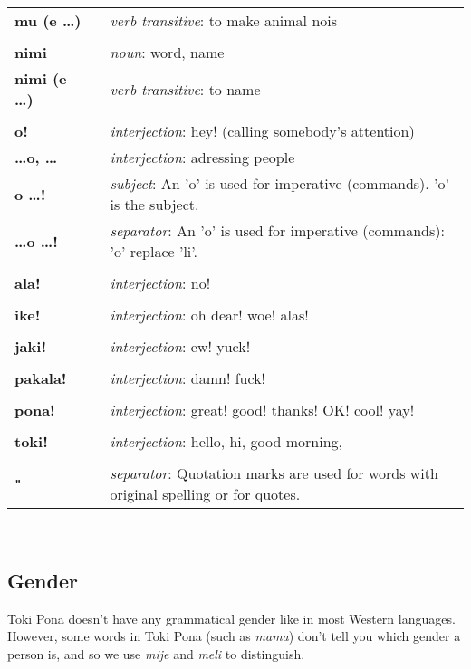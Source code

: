 \begin{supertabular}{p{2,5cm}|ll}
\textbf{mu (e \dots)} && \textit{verb transitive}: to make animal nois \\ %
 && \\ %
\textbf{nimi} && \textit{noun}: word, name \\ %
\textbf{nimi (e \dots )} && \textit{verb transitive}: to name \\ %
 && \\ %
\textbf{o!} && \textit{interjection}: hey! (calling somebody's attention) \\ %
\textbf{\dots o, \dots} && \textit{interjection}: adressing people \\ %
\textbf{o \dots !} && \textit{subject}: An 'o' is used for imperative (commands). 'o' is the subject.  \\ %
\textbf{\dots o \dots !} && \textit{separator}: An 'o' is used for imperative (commands): 'o' replace 'li'. \\ %
 && \\ %
\textbf{ala!} && \textit{interjection}: no! \\ %
 && \\ %
\textbf{ike!} && \textit{interjection}: oh dear! woe! alas! \\ %
 && \\ %
\textbf{jaki!} && \textit{interjection}: ew! yuck! \\ %
 && \\ %
\textbf{pakala!} && \textit{interjection}: damn! fuck! \\ %
 && \\ %
\textbf{pona!} && \textit{interjection}: great! good! thanks! OK! cool! yay! \\ %
 && \\ %
\textbf{toki!} && \textit{interjection}: hello, hi, good morning, \\ %
 && \\ %
\textbf{"} && \textit{separator}: Quotation marks are used for words with original spelling or for quotes. \\ %
\end{supertabular} \\
%
\subsection*{Gender}
%
Toki Pona doesn't have any grammatical gender like in most Western languages.  
However, some words in Toki Pona (such as \textit{mama}) don't tell you which gender a person is, and so we use \textit{mije} and \textit{meli} to distinguish. 

